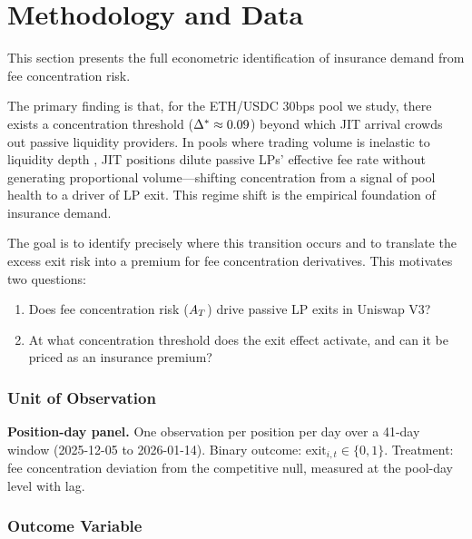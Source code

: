 
\section{Methodology and Data}\label{sec:econometric-full}

This section presents the full econometric identification of insurance demand
from fee concentration risk.

The primary finding is that, for the ETH/USDC 30bps pool we study, there
exists a concentration threshold ($\Delta^{*} \approx 0.09$) beyond which
JIT arrival crowds out passive liquidity providers. In pools where trading
volume is inelastic to liquidity depth \cite{capponi2024jit}, JIT positions
dilute passive LPs' effective fee rate without generating proportional
volume---shifting concentration from a signal of pool health to a driver of
LP exit. This regime shift is the empirical foundation of insurance demand.

The goal is to identify precisely where this transition occurs and to
translate the excess exit risk into a premium for fee concentration
derivatives. This motivates two questions:

\begin{enumerate}
  \item Does fee concentration risk ($A_T$) drive passive LP exits in
    Uniswap V3?
  \item At what concentration threshold does the exit effect activate, and
    can it be priced as an insurance premium?
\end{enumerate}

\subsubsection{Unit of Observation}

\textbf{Position-day panel.} One observation per position per day over a
41-day window (2025-12-05 to 2026-01-14). Binary outcome:
$\text{exit}_{i,t} \in \{0,1\}$. Treatment: fee concentration deviation from
the competitive null, measured at the pool-day level with lag.

\subsubsection{Outcome Variable}

